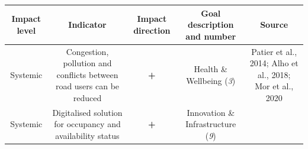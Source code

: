 \documentclass[
]{book}
\begin{document}
\begin{longtable}[]{@{}ccccc@{}}
\toprule
\begin{minipage}[b]{0.17\columnwidth}\centering
Impact level\strut
\end{minipage} & \begin{minipage}[b]{0.16\columnwidth}\centering
Indicator\strut
\end{minipage} & \begin{minipage}[b]{0.17\columnwidth}\centering
Impact direction\strut
\end{minipage} & \begin{minipage}[b]{0.17\columnwidth}\centering
Goal description and number\strut
\end{minipage} & \begin{minipage}[b]{0.17\columnwidth}\centering
Source\strut
\end{minipage}\tabularnewline
\midrule
\endhead
\begin{minipage}[t]{0.17\columnwidth}\centering
Systemic\strut
\end{minipage} & \begin{minipage}[t]{0.16\columnwidth}\centering
Congestion, pollution and conflicts between road users can be reduced\strut
\end{minipage} & \begin{minipage}[t]{0.17\columnwidth}\centering
\textbf{+}\strut
\end{minipage} & \begin{minipage}[t]{0.17\columnwidth}\centering
Health \& Wellbeing (\emph{3})\strut
\end{minipage} & \begin{minipage}[t]{0.17\columnwidth}\centering
Patier et al., 2014; Alho et al., 2018; Mor et al., 2020\strut
\end{minipage}\tabularnewline
\begin{minipage}[t]{0.17\columnwidth}\centering
Systemic\strut
\end{minipage} & \begin{minipage}[t]{0.16\columnwidth}\centering
Digitalised solution for occupancy and availability status\strut
\end{minipage} & \begin{minipage}[t]{0.17\columnwidth}\centering
\textbf{+}\strut
\end{minipage} & \begin{minipage}[t]{0.17\columnwidth}\centering
Innovation \& Infrastructure (\emph{9})\strut
\end{minipage} & \begin{minipage}[t]{0.17\columnwidth}\centering

\end{minipage}
\end{longtable}
\end{document}
